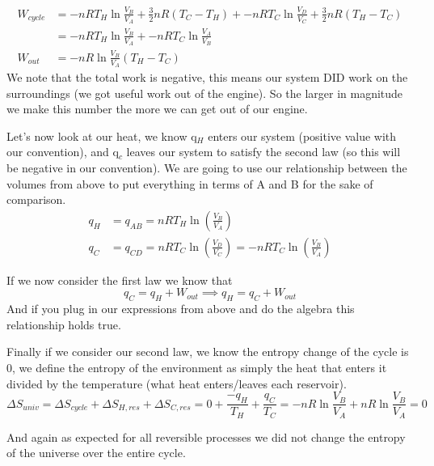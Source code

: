 \documentclass{article}
\begin{document}
\begin{equation}
\begin{split}
    W_{cycle} &= -nRT_H\ln\frac{V_B}{V_A} + \frac{3}{2} nR(T_C-T_H) + -nRT_C\ln\frac{V_D}{V_C} + \frac{3}{2} nR(T_H-T_C) \\
    &= -nRT_H\ln\frac{V_B}{V_A} + -nRT_C\ln\frac{V_A}{V_B} \\
    W_{out}&= -nR\ln\frac{V_B}{V_A}(T_H-T_C)
\end{split}
\end{equation}
We note that the total work is negative, this means our system DID work on the surroundings (we got useful work out of the engine). 
So the larger in magnitude we make this number the more we can get out of our engine. 

Let's now look at our heat, we know q$_H$ enters our system (positive value with our convention), and q$_c$ leaves our system to satisfy the second law (so this will be negative in our convention). 
We are going to use our relationship between the volumes from above to put everything in terms of A and B for the sake of comparison. 
\begin{equation}
\begin{split}
    q_H &= q_{AB} = nRT_H \ln \left(\frac{V_B}{V_A}\right)\\
    q_C &= q_{CD} = nRT_C \ln \left(\frac{V_D}{V_C}\right) = -nRT_C \ln \left(\frac{V_B}{V_A}\right) 
\end{split}
\end{equation}

If we now consider the first law we know that 
\begin{equation}
q_C = q_H + W_{out} \implies q_H = q_C + W_{out}
\end{equation}
And if you plug in our expressions from above and do the algebra this relationship holds true. 

Finally if we consider our second law, we know the entropy change of the cycle is 0, we define the entropy of the environment as simply the heat that enters it divided by the temperature (what heat enters/leaves each reservoir). 
\begin{equation}
\Delta S_{univ} = \Delta S_{cycle} + \Delta S_{H,res} + \Delta S_{C,res} = 0 + \frac{-q_H}{T_H} + \frac{q_C}{T_C} = -nR\ln\frac{V_B}{V_A} + nR\ln\frac{V_B}{V_A} = 0
\end{equation}

And again as expected for all reversible processes we did not change the entropy of the universe over the entire cycle. 
\end{document}
